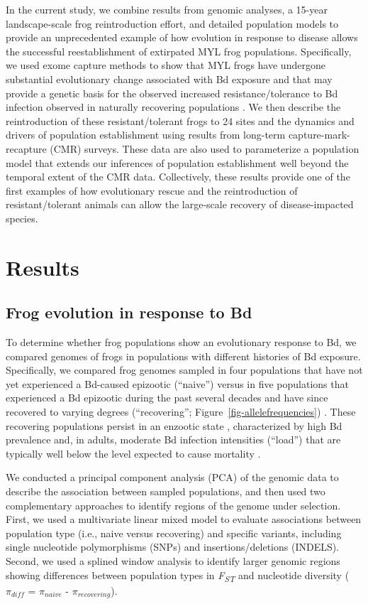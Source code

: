 \documentclass[9pt,twocolumn,twoside,lineno]{pnas-new}
\begin{document}
In the current study, we combine results from genomic analyses, a
15-year landscape-scale frog reintroduction effort, and detailed
population models to provide an unprecedented example of how evolution
in response to disease allows the successful reestablishment of
extirpated MYL frog populations. Specifically, we used exome capture
methods to show that MYL frogs have undergone substantial evolutionary
change associated with Bd exposure and that may provide a genetic basis
for the observed increased resistance/tolerance to Bd infection observed
in naturally recovering populations \citep{knapp2016}. We then describe
the reintroduction of these resistant/tolerant frogs to 24 sites and the
dynamics and drivers of population establishment using results from
long-term capture-mark-recapture (CMR) surveys. These data are also used
to parameterize a population model that extends our inferences of
population establishment well beyond the temporal extent of the CMR
data. Collectively, these results provide one of the first examples of
how evolutionary rescue and the reintroduction of resistant/tolerant
animals can allow the large-scale recovery of disease-impacted species.

\section*{Results}

\subsection*{Frog evolution in response to Bd}

To determine whether frog populations show an evolutionary response to
Bd, we compared genomes of frogs in populations with different histories
of Bd exposure. Specifically, we compared frog genomes sampled in four
populations that have not yet experienced a Bd-caused epizootic
(``naive'') \citep{zhou2015} versus in five populations that experienced
a Bd epizootic during the past several decades and have since recovered
to varying degrees (``recovering''; Figure~\ref{fig-allelefrequencies})
\citep{knapp2016, vredenburg2010}. These recovering populations persist
in an enzootic state \citep{briggs2010}, characterized by high Bd
prevalence and, in adults, moderate Bd infection intensities (``load'')
that are typically well below the level expected to cause mortality
\citep{vredenburg2010}.

We conducted a principal component analysis (PCA) of the genomic data to
describe the association between sampled populations, and then used two
complementary approaches to identify regions of the genome under
selection. First, we used a multivariate linear mixed model to evaluate
associations between population type (i.e., naive versus recovering) and
specific variants, including single nucleotide polymorphisms (SNPs) and
insertions/deletions (INDELS). Second, we used a splined window analysis
to identify larger genomic regions showing differences between
population types in \emph{F\textsubscript{ST}} and nucleotide diversity
(\(\pi_{diff}\) = \(\pi_{naive}\) - \(\pi_{recovering}\)).
\end{document}
